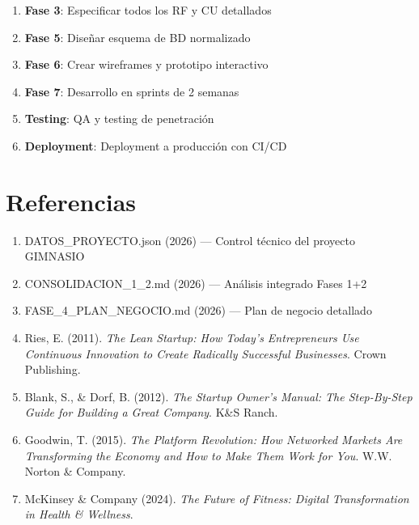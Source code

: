 \documentclass[11pt,a4paper]{article}
\begin{document}
\begin{itemize}
\begin{enumerate}
    \item \textbf{Fase 3}: Especificar todos los RF y CU detallados
    \item \textbf{Fase 5}: Diseñar esquema de BD normalizado
    \item \textbf{Fase 6}: Crear wireframes y prototipo interactivo
    \item \textbf{Fase 7}: Desarrollo en sprints de 2 semanas
    \item \textbf{Testing}: QA y testing de penetración
    \item \textbf{Deployment}: Deployment a producción con CI/CD
\end{enumerate}

\newpage
\section*{Referencias}

\begin{enumerate}
    \item DATOS\_PROYECTO.json (2026) — Control técnico del proyecto GIMNASIO

    \item CONSOLIDACION\_1\_2.md (2026) — Análisis integrado Fases 1+2

    \item FASE\_4\_PLAN\_NEGOCIO.md (2026) — Plan de negocio detallado

    \item Ries, E. (2011). \textit{The Lean Startup: How Today's Entrepreneurs Use Continuous Innovation to Create Radically Successful Businesses}. Crown Publishing.

    \item Blank, S., \& Dorf, B. (2012). \textit{The Startup Owner's Manual: The Step-By-Step Guide for Building a Great Company}. K\&S Ranch.

    \item Goodwin, T. (2015). \textit{The Platform Revolution: How Networked Markets Are Transforming the Economy and How to Make Them Work for You}. W.W. Norton \& Company.

    \item McKinsey \& Company (2024). \textit{The Future of Fitness: Digital Transformation in Health \& Wellness}.


\end{enumerate}
\end{itemize}
\end{document}
